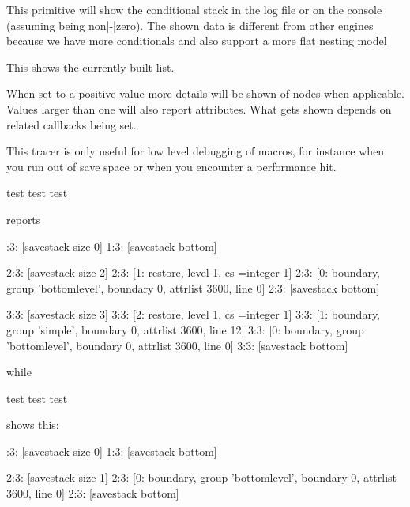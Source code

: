 This primitive will show the conditional stack in the log file or on the console
(assuming  being non|-|zero). The shown data is different
from other engines because we have more conditionals and also support a more flat
nesting model

\stopoldprimitive

\startoldprimitive[title={\prm {showlists}}]

This shows the currently built list.

\stopoldprimitive

\startoldprimitive[title={\prm {shownodedetails}}]

When set to a positive value more details will be shown of nodes when applicable.
Values larger than one will also report attributes. What gets shown depends on
related callbacks being set.

\stopoldprimitive

\startoldprimitive[title={\prm {showstack}}]

This tracer is only useful for low level debugging of macros, for instance when
you run out of save space or when you encounter a performance hit.

\starttyping
  test \showstack
 {test \showstack}
{{test \showstack}}
\stoptyping

reports

:3: [savestack size 0]
1:3: [savestack bottom]

2:3: [savestack size 2]
2:3: [1: restore, level 1, cs \scratchcounter=integer 1]
2:3: [0: boundary, group 'bottomlevel', boundary 0, attrlist 3600, line 0]
2:3: [savestack bottom]

3:3: [savestack size 3]
3:3: [2: restore, level 1, cs \scratchcounter=integer 1]
3:3: [1: boundary, group 'simple', boundary 0, attrlist 3600, line 12]
3:3: [0: boundary, group 'bottomlevel', boundary 0, attrlist 3600, line 0]
3:3: [savestack bottom]
\stoptyping

while

\starttyping
  test \showstack
 {test \showstack}
{{test \showstack}}
\stoptyping

shows this:

:3: [savestack size 0]
1:3: [savestack bottom]

2:3: [savestack size 1]
2:3: [0: boundary, group 'bottomlevel', boundary 0, attrlist 3600, line 0]
2:3: [savestack bottom]

